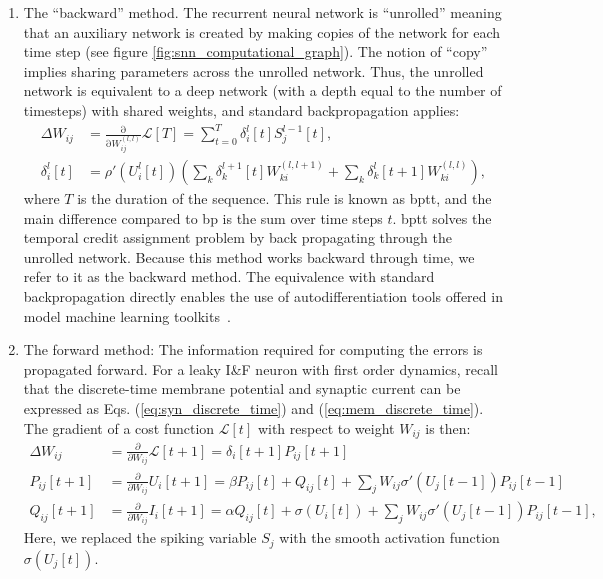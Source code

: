 \documentclass[journal,onecolumn,11pt]{IEEEtran}
\begin{document}
\begin{enumerate}
\item The ``backward'' method. The recurrent neural network is ``unrolled'' meaning that an auxiliary network is created by making copies of the network for each time step (see figure \ref{fig:snn_computational_graph}). 
The notion of ``copy'' implies sharing parameters across the unrolled network.
Thus, the unrolled network is equivalent to a deep network (with a depth equal to the number of timesteps) with shared weights, and standard backpropagation applies:
%
\begin{equation}\label{eq:bp_deep}
  \begin{split}
    \Delta {W_{ij}} &= \frac{\mathrm{\partial}}{\mathrm{\partial} W^{(l,l)}_{ij}} \mathcal{L}[T]  = \sum_{t=0}^T \delta_{i}^{l}[t]  S^{l-1}_j[t],\\
    \delta_{i}^{l} [t] & = \rho'\left( U_i^l [t] \right) \left( \sum_k \delta_{k}^{l+1}[t] W_{ki}^{(l,l+1)} + \sum_k \delta_{k}^{l}[t+1] W_{ki}^{(l,l)} \right),
  \end{split}
\end{equation}
%
where $T$ is the duration of the sequence.
This rule is known as \gls{bptt}, and the main difference compared to \gls{bp} is the sum over time steps $t$.
\gls{bptt} solves the temporal credit assignment problem by back propagating through the unrolled network.
Because this method works backward through time, we refer to it as the backward method.
The equivalence with standard backpropagation directly enables the use of autodifferentiation tools offered in model machine learning toolkits~\cite{Bellec_etal18_longshor,Shrestha_Orchard18_slayspik,Wozniak_etal18_deepnetw}.\\
\item The forward method: The information required for computing the errors is propagated forward.
  For a leaky I\&F neuron with first order dynamics, recall that the discrete-time membrane potential and synaptic current can be expressed as Eqs. (\ref{eq:syn_discrete_time}) and (\ref{eq:mem_discrete_time}).
The gradient of a cost function $\mathcal{L}[t]$ with respect to weight $W_{ij}$ is then:
\[
\begin{split}
 \Delta {W_{ij}} &= \frac{\partial }{\partial W_{ij}} \mathcal{L}[t+1] = \delta_i[t+1] P_{ij}[t+1]\\
 P_{ij}[t+1]     &= \frac{\partial} {\partial W_{ij}}  U_i[t+1] = \beta P_{ij}[t] + Q_{ij}[t] + \sum_j W_{ij} \sigma'(U_j[t-1]) P_{ij}[t-1]\\
 Q_{ij}[t+1]     &= \frac{\partial} {\partial W_{ij}}  I_i[t+1] = \alpha Q_{ij}[t] + \sigma(U_i[t]) + \sum_j W_{ij} \sigma'(U_j[t-1]) P_{ij}[t-1],
\end{split}
\]
Here, we replaced the spiking variable $S_j$ with the smooth activation function $\sigma(U_j[t])$.


\end{enumerate}
\end{document}
